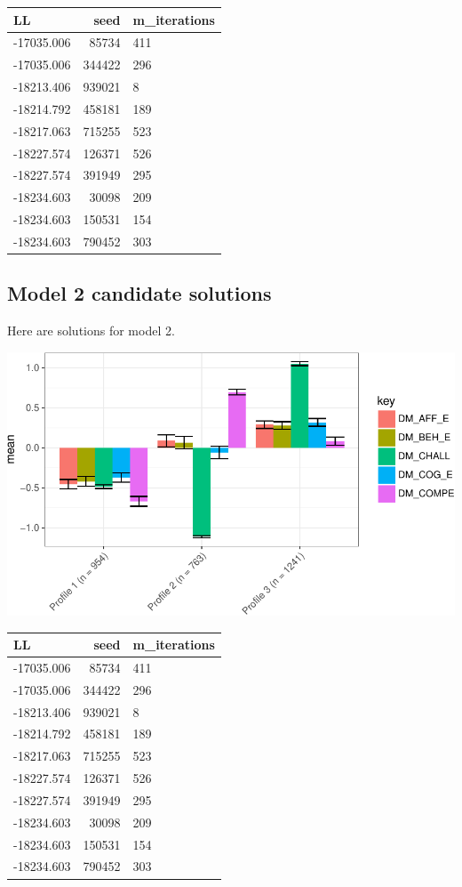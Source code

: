 \documentclass[]{msu-thesis}
\theoremstyle{definition}
\theoremstyle{definition}
\theoremstyle{definition}
\theoremstyle{remark}
\begin{document}
\begin{tabular}{l|r|l}
\hline
LL & seed & m\_iterations\\
\hline
-17035.006 & 85734 & 411\\
\hline
-17035.006 & 344422 & 296\\
\hline
-18213.406 & 939021 & 8\\
\hline
-18214.792 & 458181 & 189\\
\hline
-18217.063 & 715255 & 523\\
\hline
-18227.574 & 126371 & 526\\
\hline
-18227.574 & 391949 & 295\\
\hline
-18234.603 & 30098 & 209\\
\hline
-18234.603 & 150531 & 154\\
\hline
-18234.603 & 790452 & 303\\
\hline
\end{tabular}

\subsection{Model 2 candidate
solutions}\label{model-2-candidate-solutions}

Here are solutions for model 2.

\begin{center}\includegraphics[width=0.8\linewidth]{rosenberg-dissertation_files/figure-latex/m2_3p-1} \end{center}

\begin{tabular}{l|r|l}
\hline
LL & seed & m\_iterations\\
\hline
-17035.006 & 85734 & 411\\
\hline
-17035.006 & 344422 & 296\\
\hline
-18213.406 & 939021 & 8\\
\hline
-18214.792 & 458181 & 189\\
\hline
-18217.063 & 715255 & 523\\
\hline
-18227.574 & 126371 & 526\\
\hline
-18227.574 & 391949 & 295\\
\hline
-18234.603 & 30098 & 209\\
\hline
-18234.603 & 150531 & 154\\
\hline
-18234.603 & 790452 & 303\\
\hline
\end{tabular}
\end{document}
